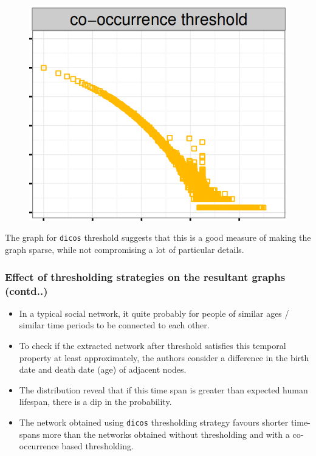 \documentclass[10pt, compress]{beamer}
\begin{document}
\begin{frame}[fragile]
\begin{figure}
\begin{minipage}{0.32\linewidth}
\end{minipage}
\hfill
\begin{minipage}{0.32\linewidth}
	\centering
    \includegraphics[width=\textwidth]{cooc-pdf.png}
\end{minipage}
\end{figure}

\begin{center}
The graph for \texttt{dicos} threshold suggests that this is a good measure of making the graph sparse, while not compromising a lot of particular details.
\end{center}
\end{frame}

\begin{frame}[fragile]
	\frametitle{\normalsize Effect of thresholding strategies on the resultant graphs {\small (contd..)}}
\vspace{-5mm}
\begin{itemize}
\item In a typical social network, it quite probably for people of similar ages / similar time periods to be connected to each other.
\item To check if the extracted network after threshold satisfies this temporal property at least approximately, the authors consider a difference in the birth date and death date (age) of adjacent nodes.
\item The distribution reveal that if this time span is greater than expected human lifespan, there is a dip in the probability.
\item The network obtained using \texttt{dicos} thresholding strategy favours shorter time-spans more than the networks obtained without thresholding and with a co-occurrence based thresholding.
\end{itemize}
\end{frame}
\end{document}

